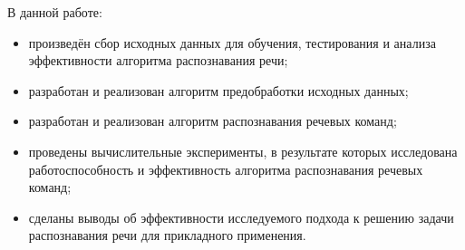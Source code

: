 В данной работе:
\begin{itemize}[leftmargin=2cm]
\item произведён сбор исходных данных для обучения, тестирования и анализа эффективности алгоритма распознавания речи;
\item разработан и реализован алгоритм предобработки исходных данных;
\item разработан и реализован алгоритм распознавания речевых команд;
\item проведены вычислительные эксперименты, в результате которых исследована работоспособность и эффективность алгоритма распознавания речевых команд;
\item сделаны выводы об эффективности исследуемого подхода к решению задачи распознавания речи для прикладного применения.
\end{itemize}